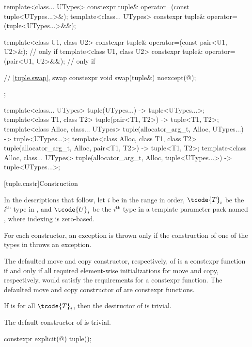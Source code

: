 \begin{codeblock}
{{    template<class... UTypes>
      constexpr tuple& operator=(const tuple<UTypes...>&);
    template<class... UTypes>
      constexpr tuple& operator=(tuple<UTypes...>&&);

    template<class U1, class U2>
      constexpr tuple& operator=(const pair<U1, U2>&);          // only if 
    template<class U1, class U2>
      constexpr tuple& operator=(pair<U1, U2>&&);               // only if 

    // \ref{tuple.swap},  swap
    constexpr void swap(tuple&) noexcept(@\seebelow@);
  };

  template<class... UTypes>
    tuple(UTypes...) -> tuple<UTypes...>;
  template<class T1, class T2>
    tuple(pair<T1, T2>) -> tuple<T1, T2>;
  template<class Alloc, class... UTypes>
    tuple(allocator_arg_t, Alloc, UTypes...) -> tuple<UTypes...>;
  template<class Alloc, class T1, class T2>
    tuple(allocator_arg_t, Alloc, pair<T1, T2>) -> tuple<T1, T2>;
  template<class Alloc, class... UTypes>
    tuple(allocator_arg_t, Alloc, tuple<UTypes...>) -> tuple<UTypes...>;
}
\end{codeblock}

[tuple.cnstr]{Construction}

\pnum
In the descriptions that follow, let $i$ be in the range
 in order, $\tcode{T}_i$
be the $i^\text{th}$ type in , and
$\tcode{U}_i$ be the $i^\text{th}$ type in a template parameter pack named , where indexing
is zero-based.

\pnum
For each  constructor, an exception is thrown only if the construction of
one of the types in  throws an exception.

\pnum
The defaulted move and copy constructor, respectively, of
 is a constexpr function if and only if all
required element-wise initializations for move and copy, respectively,
would satisfy the requirements for a constexpr function. The
defaulted move and copy constructor of  are
constexpr functions.

\pnum
If  is  for all $\tcode{T}_i$,
then the destructor of  is trivial.

\pnum
The default constructor of  is trivial.

%
\begin{itemdecl}
constexpr explicit(@\seebelow@) tuple();
\end{itemdecl}


